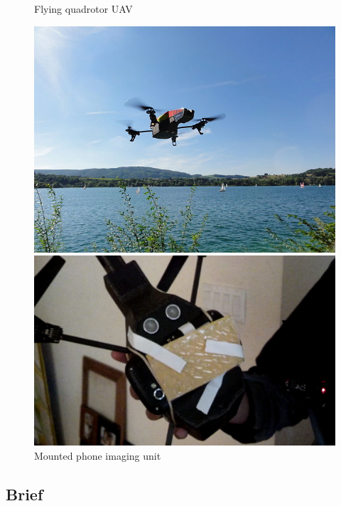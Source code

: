 \begin{figure}[H]
	\begin{minipage}{.5\textwidth}
		\caption{Flying quadrotor UAV \cite{Wiki:ARDrone}}
		\centering
			\includegraphics[width=0.95\linewidth]{illustrations/ardrone}
	\end{minipage}
	\begin{minipage}{.5\textwidth}
		\caption{Mounted phone imaging unit}
		\centering
			\includegraphics[width=0.95\linewidth]{illustrations/mounted}
	\end{minipage}
\end{figure}

\subsection{Brief}


